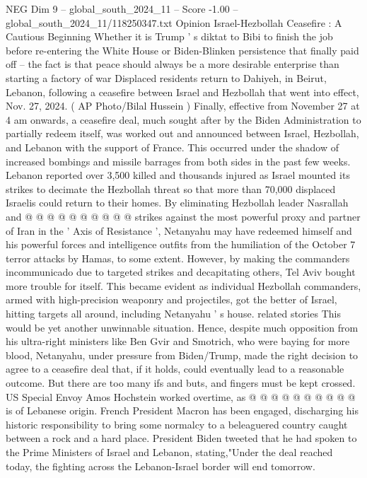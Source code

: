 \begin{textsample}{NEG Dim 9 – global\_south\_2024\_11 – Score -1.00 – global\_south\_2024\_11/118250347.txt}  \label{ex:f9_neg_315}
Opinion Israel-Hezbollah Ceasefire : A Cautious Beginning Whether it is Trump ' s diktat to Bibi to finish the job before re-entering the White House or Biden-Blinken persistence that finally paid off -- the fact is that peace should always be a more desirable enterprise than starting a factory of war Displaced residents return to Dahiyeh, in Beirut, Lebanon, following a ceasefire between Israel and Hezbollah that went into effect, Nov. 27, 2024. ( AP Photo/Bilal Hussein ) Finally, effective from November 27 at 4 am onwards, a ceasefire deal, much sought after by the Biden Administration to partially redeem itself, was worked out and announced between Israel, Hezbollah, and Lebanon with the support of France.
This occurred under the shadow of increased bombings and missile barrages from both sides in the past few weeks.
Lebanon reported over 3,500 killed and thousands injured as Israel mounted its strikes to decimate the Hezbollah threat so that more than 70,000 displaced Israelis could return to their homes.
By eliminating Hezbollah leader Nasrallah and @ @ @ @ @ @ @ @ @ @ strikes against the most powerful proxy and partner of Iran in the ' Axis of Resistance ', Netanyahu may have redeemed himself and his powerful forces and intelligence outfits from the humiliation of the October 7 terror attacks by Hamas, to some extent.
However, by making the commanders incommunicado due to targeted strikes and decapitating others, Tel Aviv bought more trouble for itself.
This became evident as individual Hezbollah commanders, armed with high-precision weaponry and projectiles, got the better of Israel, hitting targets all around, including Netanyahu ' s house. related stories This would be yet another unwinnable situation.
Hence, despite much opposition from his ultra-right ministers like Ben Gvir and Smotrich, who were baying for more blood, Netanyahu, under pressure from Biden/Trump, made the right decision to agree to a ceasefire deal that, if it holds, could eventually lead to a reasonable outcome.
But there are too many ifs and buts, and fingers must be kept crossed.
US Special Envoy Amos Hochstein worked overtime, as @ @ @ @ @ @ @ @ @ @ is of Lebanese origin.
French President Macron has been engaged, discharging his historic responsibility to bring some normalcy to a beleaguered country caught between a rock and a hard place.
President Biden tweeted that he had spoken to the Prime Ministers of Israel and Lebanon, stating,"Under the deal reached today, the fighting across the Lebanon-Israel border will end tomorrow.

\end{textsample}
